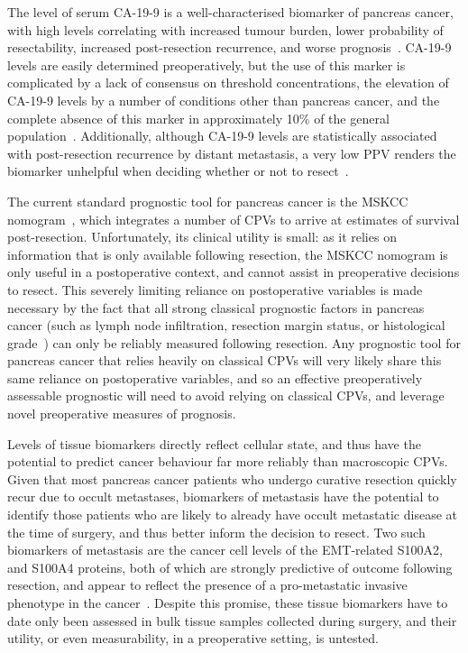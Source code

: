 \documentclass[dissertation.tex]{subfiles}
\begin{document}
The level of serum \gls{CA-19-9} is a well-characterised biomarker of pancreas cancer, with high levels correlating with increased tumour burden, lower probability of resectability, increased post-resection recurrence, and worse prognosis~\cite{Kim2011, Ballehaninna2012, Barugola2007, Lundin1994}.  \Gls{CA-19-9} levels are easily determined preoperatively, but the use of this marker is complicated by a lack of consensus on threshold concentrations, the elevation of \gls{CA-19-9} levels by a number of conditions other than pancreas cancer, and the complete absence of this marker in approximately 10\% of the general population~\cite{Ballehaninna2012}.  Additionally, although \gls{CA-19-9} levels are statistically associated with post-resection recurrence by distant metastasis, a very low \gls{PPV} renders the biomarker unhelpful when deciding whether or not to resect~\cite{Kim2011}.

The current standard prognostic tool for pancreas cancer is the \gls{MSKCC} nomogram~\cite{Brennan2004}, which integrates a number of \glspl{CPV} to arrive at estimates of survival post-resection.  Unfortunately, its clinical utility is small: as it relies on information that is only available following resection, the \gls{MSKCC} nomogram is only useful in a postoperative context, and cannot assist in preoperative decisions to resect.  This severely limiting reliance on postoperative variables is made necessary by the fact that all strong classical prognostic factors in pancreas cancer (such as lymph node infiltration, resection margin status, or histological grade~\cite{Bilici2014}) can only be reliably measured following resection.  Any prognostic tool for pancreas cancer that relies heavily on classical \glspl{CPV} will very likely share this same reliance on postoperative variables, and so an effective preoperatively assessable prognostic will need to avoid relying on classical \glspl{CPV}, and leverage novel preoperative measures of prognosis.

Levels of tissue biomarkers directly reflect cellular state, and thus have the potential to predict cancer behaviour far more reliably than macroscopic \glspl{CPV}.  Given that most pancreas cancer patients who undergo curative resection quickly recur due to occult metastases, biomarkers of metastasis have the potential to identify those patients who are likely to already have occult metastatic disease at the time of surgery, and thus better inform the decision to resect.  Two such biomarkers of metastasis are the cancer cell levels of the \gls{EMT}-related S100A2, and S100A4 proteins, both of which are strongly predictive of outcome following resection, and appear to reflect the presence of a pro-metastatic invasive phenotype in the cancer~\cite{Biankin2009, Tsukamoto2013, Lee2014}.  Despite this promise, these tissue biomarkers have to date only been assessed in bulk tissue samples collected during surgery, and their utility, or even measurability, in a preoperative setting, is untested.
\end{document}
